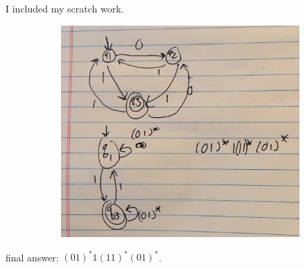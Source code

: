 \documentclass[20pt]{article} %
\begin{document}
I included my scratch work.
\begin{figure}[!htbp]
  	\centering
   	\begin{subfigure}[p]{0.7\linewidth}
    	\includegraphics[width=\linewidth]{./figures/h4-4.jpg}
   	\end{subfigure}
\end{figure} 
final answer: $(01)^{*}1(11)^{*}(01)^{*}$.

\newpage
\end{document}
